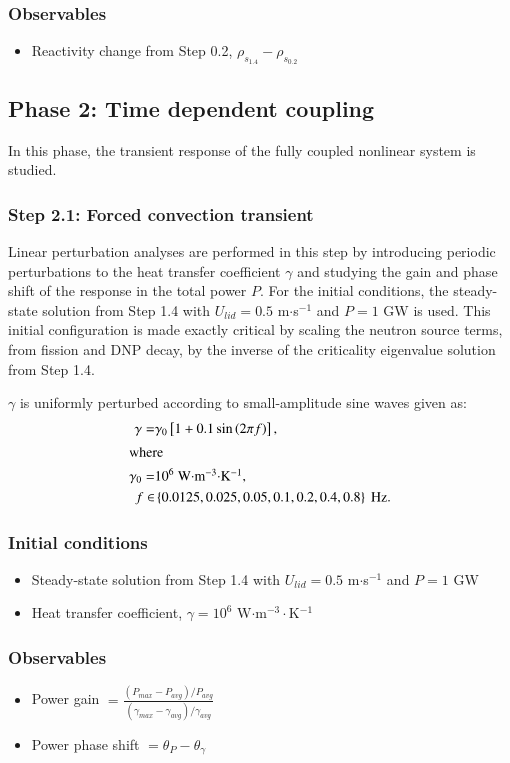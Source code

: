 \subsubsection*{Observables}
\begin{itemize}
    \item Reactivity change from Step 0.2, $\rho_{s_{1.4}} - \rho_{s_{0.2}}$
\end{itemize}

\subsection{Phase 2: Time dependent coupling}

In this phase, the transient response of the fully coupled nonlinear system is
studied.

\subsubsection{Step 2.1: Forced convection transient}

Linear perturbation analyses are performed in this step by introducing periodic
perturbations to the heat transfer coefficient $\gamma$ and studying the gain
and phase shift of the response in the total power $P$. For the initial
conditions, the steady-state solution from Step 1.4 with
$U_{lid} = 0.5$ m$\cdot$s$^{-1}$ and $P = 1$ GW is used. This initial
configuration is made exactly critical by scaling the neutron source terms,
from fission and \gls{DNP} decay, by the inverse of the criticality eigenvalue
solution from Step 1.4.

$\gamma$ is uniformly perturbed according to small-amplitude sine waves given
as:
\begin{align}
    \gamma =& \gamma_0 \left[ 1 + 0.1\sin\left(2 \pi f \right) \right], \\
    \intertext{where}
    \gamma_0 =& 10^6 \mbox{ W$\cdot$m$^{-3}\cdot$K$^{-1}$}, \nonumber \\
    f \in& \left\lbrace 0.0125, 0.025, 0.05, 0.1, 0.2, 0.4, 0.8 \right\rbrace 
    \mbox{ Hz.} \nonumber
\end{align}

\subsubsection*{Initial conditions}
\begin{itemize}
    \item Steady-state solution from Step 1.4 with
    $U_{lid} = 0.5$ m$\cdot$s$^{-1}$ and $P = 1$ GW
    \item Heat transfer coefficient, $\gamma = 10^6$ W$\cdot$m$^{-3}\cdot$K$^{-1}$
\end{itemize}
%
\subsubsection*{Observables}
\begin{itemize}
    \item Power gain $= \frac{\left(P_{max} - P_{avg}\right)/P_{avg}}{
    \left(\gamma_{max} - \gamma_{avg}\right)/\gamma_{avg}}$
    \item Power phase shift $=\theta_P - \theta_\gamma$
\end{itemize}
